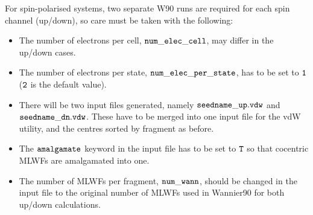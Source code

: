 \documentclass{report}
\begin{document}
For spin-polarised systems, two separate W90 runs are required for 
each spin channel (up/down), so care must be taken with the following:

\begin{itemize}
\item The number of electrons per cell, $\tt{num\_elec\_cell}$, 
may differ in the up/down cases.

\item The number of electrons per state, $\tt{num\_elec\_per\_state}$, 
has to be set to $\tt{1}$ ($\tt{2}$ is the default value).

\item There will be two input files generated, namely 
$\tt{seedname\_up.vdw}$ and $\tt{seedname\_dn.vdw}$.
These have to be merged into one input file for the 
vdW utility, and the centres sorted by fragment as before. 

\item The $\tt{amalgamate}$ keyword in the input file has to be set 
to $\tt{T}$ so that cocentric MLWFs are amalgamated into one.

\item The number of MLWFs per fragment, $\tt{num\_wann}$, should 
be changed in the input file to the original number of MLWFs used 
in Wannier90 for both up/down calculations.
\end{itemize}
\end{document}

